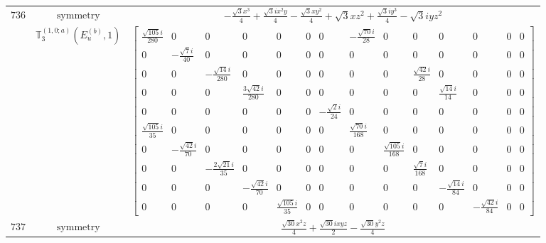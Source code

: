 \documentclass[fleqn,8pt,landscape]{jsarticle}
\begin{document}
\begin{longtable}{ccc}
$ 736 $ & $ \text{symmetry} $ & $ - \frac{\sqrt{3} x^{3}}{4} + \frac{\sqrt{3} i x^{2} y}{4} - \frac{\sqrt{3} x y^{2}}{4} + \sqrt{3} x z^{2} + \frac{\sqrt{3} i y^{3}}{4} - \sqrt{3} i y z^{2} $ \\
$  $ & $ \mathbb{T}_{3}^{(1,0;a)}(E_{u}^{(b)},1) $ & $ \begin{bmatrix} \frac{\sqrt{105} i}{280} & 0 & 0 & 0 & 0 & 0 & 0 & - \frac{\sqrt{70} i}{28} & 0 & 0 & 0 & 0 & 0 & 0 \\ 0 & - \frac{\sqrt{7} i}{40} & 0 & 0 & 0 & 0 & 0 & 0 & 0 & 0 & 0 & 0 & 0 & 0 \\ 0 & 0 & - \frac{\sqrt{14} i}{280} & 0 & 0 & 0 & 0 & 0 & 0 & \frac{\sqrt{42} i}{28} & 0 & 0 & 0 & 0 \\ 0 & 0 & 0 & \frac{3 \sqrt{42} i}{280} & 0 & 0 & 0 & 0 & 0 & 0 & \frac{\sqrt{14} i}{14} & 0 & 0 & 0 \\ 0 & 0 & 0 & 0 & 0 & 0 & - \frac{\sqrt{2} i}{24} & 0 & 0 & 0 & 0 & 0 & 0 & 0 \\ \frac{\sqrt{105} i}{35} & 0 & 0 & 0 & 0 & 0 & 0 & \frac{\sqrt{70} i}{168} & 0 & 0 & 0 & 0 & 0 & 0 \\ 0 & - \frac{\sqrt{42} i}{70} & 0 & 0 & 0 & 0 & 0 & 0 & \frac{\sqrt{105} i}{168} & 0 & 0 & 0 & 0 & 0 \\ 0 & 0 & - \frac{2 \sqrt{21} i}{35} & 0 & 0 & 0 & 0 & 0 & 0 & \frac{\sqrt{7} i}{168} & 0 & 0 & 0 & 0 \\ 0 & 0 & 0 & - \frac{\sqrt{42} i}{70} & 0 & 0 & 0 & 0 & 0 & 0 & - \frac{\sqrt{14} i}{84} & 0 & 0 & 0 \\ 0 & 0 & 0 & 0 & \frac{\sqrt{105} i}{35} & 0 & 0 & 0 & 0 & 0 & 0 & - \frac{\sqrt{42} i}{84} & 0 & 0 \end{bmatrix} $ \\ \hline
$ 737 $ & $ \text{symmetry} $ & $ \frac{\sqrt{30} x^{2} z}{4} + \frac{\sqrt{30} i x y z}{2} - \frac{\sqrt{30} y^{2} z}{4} $ \\

\end{longtable}
\end{document}
